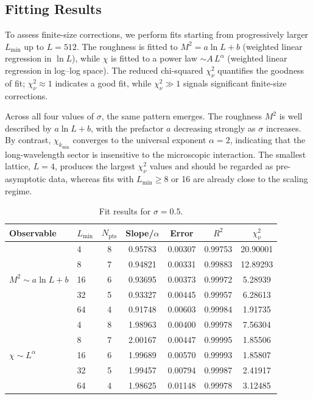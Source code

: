 \documentclass[11pt,a4paper]{article}
\begin{document}
\clearpage
\subsection{Fitting Results}

To assess finite-size corrections, we perform fits starting from
progressively larger $L_{\min}$ up to $L=512$.
The roughness is fitted to $M^2 = a\ln L + b$ (weighted linear regression
in $\ln L$), while $\chi$ is fitted to a power law
$\sim A\, L^{\alpha}$ (weighted linear regression in log--log space).
The reduced chi-squared $\chi^2_\nu$ quantifies the goodness of fit;
$\chi^2_\nu \approx 1$ indicates a good fit, while $\chi^2_\nu \gg 1$
signals significant finite-size corrections.

Across all four values of $\sigma$, the same pattern emerges. The roughness
$M^2$ is well described by $a\ln L+b$, with the prefactor $a$ decreasing
strongly as $\sigma$ increases. By contrast, $\chi_{k_{\min}}$ converges to
the universal exponent $\alpha=2$, indicating that the long-wavelength sector
is insensitive to the microscopic interaction.
The smallest lattice, $L=4$, produces the largest $\chi^2_\nu$ values and
should be regarded as pre-asymptotic data, whereas fits with $L_{\min}\ge 8$
or 16 are already close to the scaling regime.

\begin{table}[htbp]
\centering
\caption{Fit results for $\sigma=0.5$.}
\label{tab:fit05}
\small
\begin{tabular}{@{}llcS[table-format=1.5]S[table-format=1.5]S[table-format=1.5]S[table-format=2.5]@{}}
\toprule
Observable & $L_{\min}$ & $N_{\mathrm{pts}}$ & {Slope/$\alpha$} & {Error} & {$R^2$} & {$\chi^2_\nu$} \\
\midrule
{}
 & 4  & 8 & 0.95783 & 0.00307 & 0.99753 & 20.90001 \\
 & 8  & 7 & 0.94821 & 0.00331 & 0.99883 & 12.89293 \\
 & 16 & 6 & 0.93695 & 0.00373 & 0.99972 &  5.28939 \\
 & 32 & 5 & 0.93327 & 0.00445 & 0.99957 &  6.28613 \\
 & 64 & 4 & 0.91748 & 0.00603 & 0.99984 &  1.91735 \\
\midrule
{}
 & 4  & 8 & 1.98963 & 0.00400 & 0.99978 &  7.56304 \\
 & 8  & 7 & 2.00167 & 0.00447 & 0.99995 &  1.85506 \\
 & 16 & 6 & 1.99689 & 0.00570 & 0.99993 &  1.85807 \\
 & 32 & 5 & 1.99457 & 0.00794 & 0.99987 &  2.41917 \\
 & 64 & 4 & 1.98625 & 0.01148 & 0.99978 &  3.12485 \\
\bottomrule
\end{tabular}
\end{table}
\end{document}
